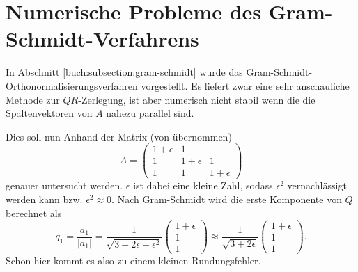 %
%
%
\section{Numerische Probleme des Gram-Schmidt-Verfahrens
\label{qr:section:problemstellung}}
%
In Abschnitt \ref{buch:subsection:gram-schmidt} wurde das Gram-Schmidt-Orthonormalisierungsverfahren vorgestellt.
Es liefert zwar eine sehr anschauliche Methode zur $QR$-Zerlegung, ist aber numerisch nicht stabil wenn die die Spaltenvektoren von $A$ nahezu parallel sind.

Dies soll nun Anhand der Matrix (von \cite{qr:tam} übernommen)
\begin{equation*}
A=\begin{pmatrix}
1+\epsilon&1&\\
1&1+\epsilon&1\\
1&1&1+\epsilon
\end{pmatrix}
\end{equation*}
genauer untersucht werden.
$\epsilon$ ist dabei eine \glqq kleine\grqq{} Zahl, sodass $\epsilon^2$ vernachlässigt werden kann bzw. $\epsilon^2\approx0$.
Nach Gram-Schmidt wird die erste Komponente von $Q$ berechnet als
\begin{equation*}
q_1=\frac{a_1}{|a_1|}=\frac{1}{\sqrt{3+2\epsilon+\epsilon^2}}
\begin{pmatrix}
1+\epsilon\\
1\\
1
\end{pmatrix}\approx\frac{1}{\sqrt{3+2\epsilon}}
\begin{pmatrix}
1+\epsilon\\
1\\
1
\end{pmatrix}.
\end{equation*}
Schon hier kommt es also zu einem kleinen Rundungsfehler.

